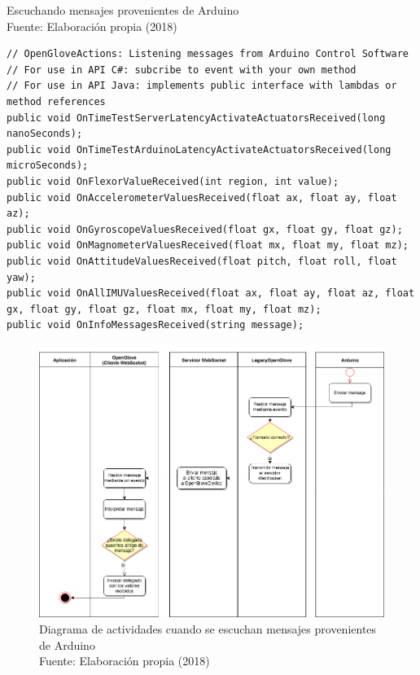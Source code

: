 \begin{algorithm}[!ht]
  \begin{center}
   	\captionsetup{justification=centering}
    \caption[Escuchando mensajes provenientes de Arduino]{Escuchando mensajes provenientes de Arduino\\ \tab[4cm] Fuente: Elaboración propia (2018)}
    \label{fig:methods-4-listening-arduino}
  \end{center}
  \begin{lstlisting}
// OpenGloveActions: Listening messages from Arduino Control Software
// For use in API C#: subcribe to event with your own method
// For use in API Java: implements public interface with lambdas or method references
public void OnTimeTestServerLatencyActivateActuatorsReceived(long nanoSeconds);
public void OnTimeTestArduinoLatencyActivateActuatorsReceived(long microSeconds);
public void OnFlexorValueReceived(int region, int value);
public void OnAccelerometerValuesReceived(float ax, float ay, float az);
public void OnGyroscopeValuesReceived(float gx, float gy, float gz);
public void OnMagnometerValuesReceived(float mx, float my, float mz);
public void OnAttitudeValuesReceived(float pitch, float roll, float yaw);
public void OnAllIMUValuesReceived(float ax, float ay, float az, float gx, float gy, float gz, float mx, float my, float mz);
public void OnInfoMessagesReceived(string message);
\end{lstlisting}
\end{algorithm}

\begin{figure}[H]
  \begin{center} 
   	\includegraphics[width=1.0\textwidth]{images/chapter04/ActivityDiagrams-ListeningMessagesFromArduino.png} 
   	\captionsetup{justification=centering}
    \caption[Diagrama de actividades cuando se escuchan mensajes provenientes de Arduino]{Diagrama de actividades cuando se escuchan mensajes provenientes de Arduino\\Fuente: Elaboración propia (2018)}
    \label{fig:activity-diagrams-4-ListeningMessagesFromArduino}
  \end{center}
\end{figure}

